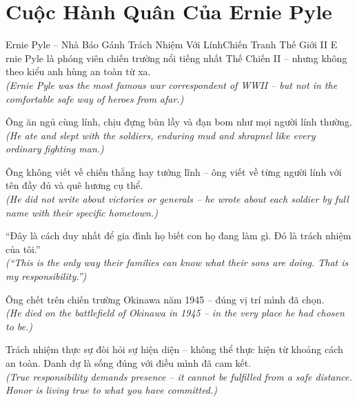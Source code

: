 \section{Cuộc Hành Quân Của Ernie Pyle}
\begin{truyen}{Ernie Pyle -- Nhà Báo Gánh Trách Nhiệm Với Lính}{Chiến Tranh Thế Giới II}
E rnie Pyle là phóng viên chiến trường nổi tiếng nhất Thế Chiến II -- nhưng không theo kiểu anh hùng an toàn từ xa.\\
\textit{(Ernie Pyle was the most famous war correspondent of WWII -- but not in the comfortable safe way of heroes from afar.)}

Ông ăn ngủ cùng lính, chịu đựng bùn lầy và đạn bom như mọi người lính thường.\\
\textit{(He ate and slept with the soldiers, enduring mud and shrapnel like every ordinary fighting man.)}

Ông không viết về chiến thắng hay tướng lĩnh -- ông viết về từng người lính với tên đầy đủ và quê hương cụ thể.\\
\textit{(He did not write about victories or generals -- he wrote about each soldier by full name with their specific hometown.)}

``Đây là cách duy nhất để gia đình họ biết con họ đang làm gì. Đó là trách nhiệm của tôi.''\\
\textit{(``This is the only way their families can know what their sons are doing. That is my responsibility.'')}

Ông chết trên chiến trường Okinawa năm 1945 -- đúng vị trí mình đã chọn.\\
\textit{(He died on the battlefield of Okinawa in 1945 -- in the very place he had chosen to be.)}

\end{truyen}
\begin{baihoc}
  Trách nhiệm thực sự đòi hỏi sự hiện diện -- không thể thực hiện từ khoảng cách an toàn. Danh dự là sống đúng với điều mình đã cam kết.\\
  \textit{(True responsibility demands presence -- it cannot be fulfilled from a safe distance. Honor is living true to what you have committed.)}
\end{baihoc}
